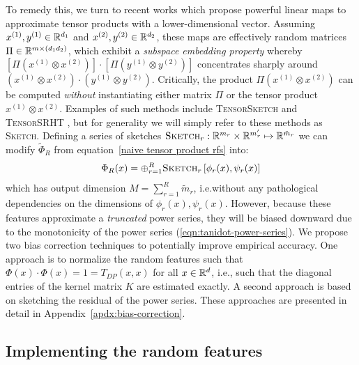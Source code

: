 To remedy this, we turn to recent works which propose powerful linear maps
to approximate tensor products
with a lower-dimensional vector.
Assuming $x^{(1)},y^{(1)}\in\mathbb{R}^{d_1}$ and $x^{(2)},y^{(2)}\in\mathbb{R}^{d_2}$,
these maps are effectively random matrices $\Pi\in \mathbb{R}^{m\times (d_1d_2)}$,
which exhibit a \emph{subspace embedding property} whereby $[\Pi(x^{(1)}\otimes x^{(2)})]\cdot[\Pi(y^{(1)}\otimes y^{(2)})]$ concentrates sharply around $(x^{(1)}\otimes x^{(2)})\cdot(y^{(1)}\otimes y^{(2)})$.
Critically, the product $\Pi(x^{(1)}\otimes x^{(2)})$ can be computed \emph{without} instantiating either matrix $\Pi$ or the tensor product $x^{(1)}\otimes x^{(2)}$.
Examples of such methods include
\textsc{TensorSketch} and \textsc{TensorSRHT}
\citep{pagh2013compressed,pham2013fast, ahle2020oblivious},
but for generality we will simply refer to these methods as \textsc{Sketch}.
Defining a series of sketches $\textsc{Sketch}_r:\mathbb{R}^{m_r}\times \mathbb{R}^{m'_r}\mapsto \mathbb{R}^{\tilde{m}_r}$
we can modify $\tilde\Phi_R$ from equation~\ref{naive tensor product rfs} into:
\begin{equation}\label{sketch tensor product rfs}
    \Phi_R(x) = \oplus_{r=1}^R \textsc{Sketch}_r\left[\phi_r(x),  \psi_r(x)\right]
\end{equation}
which has output dimension $M=\sum_{r=1}^R \tilde{m}_r$, i.e.\@ without any pathological dependencies on the dimensions of $\phi_r(x),\psi_r(x)$.
However, because these features approximate a \emph{truncated} power series, they will be biased downward 
due to the monotonicity of the power series (\ref{eqn:tanidot-power-series}).
We propose two bias correction techniques to potentially improve empirical accuracy.
One approach is to normalize the random features such that $\Phi(x)\cdot\Phi(x)=1 = T_{DP}(x,x)$ for all $x\in\mathbb{R}^d$, i.e., such that the diagonal entries of the kernel matrix $K$ are estimated exactly.
A second approach is based on sketching the residual of the power series.
These approaches are presented in detail in Appendix~\ref{apdx:bias-correction}.


\subsection{Implementing the random features}\label{ssec:implementing tdp rf}

